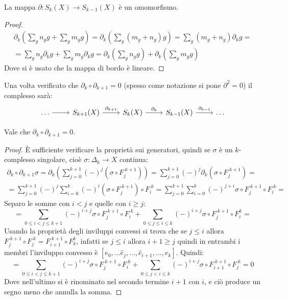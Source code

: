 \begin{proposition}
  La mappa $ \partial \colon S_k(X) \to S_{k-1}(X) $ è un omomorfismo.
\end{proposition}
\begin{proof}
  \begin{gather*}
    \partial_k \left( \sum_g n_g g + \sum_g m_g g\right) = \partial_k \left( \sum_g(m_g + n_g)g \right) = \sum_g (m_g + n_g) \partial_k g = \\
    = \sum_g n_g \partial_k g + \sum_g m_g \partial_k g = \partial_k \left( \sum_g n_g g\right) + \partial_k \left( \sum_g m_g g \right)
  \end{gather*}
  Dove si è usato che la mappa di bordo è lineare.
\end{proof}
\hfill \newline \newline \noindent
Una volta verificato che $ \partial_k \circ \partial_{k+1} = 0 $ (spesso come notazione si pone $ \partial^2 = 0 $)
il complesso sarà:
\[
  \begin{tikzcd}
    \dots \rar & S_{k+1}(X) \arrow{r}{\partial_{k+1}} & S_k(X) \arrow{r}{\partial_k} & S_{k-1}(X) \arrow{r}{\partial_{k-1}} & \dots
  \end{tikzcd}
\]
\vspace*{-12pt}
\begin{proposition}
  Vale che $ \partial_k \circ \partial_{k+1} = 0 $.
\end{proposition}
\begin{proof}
  È sufficiente verificare la proprietà sui generatori, quindi se $ \sigma $ è un
  $ k $-complesso singolare, cioè $ \sigma : \Delta_k \to X $ continua:
  \begin{gather*}
    \partial_k \circ \partial_{k+1} \sigma = \partial_k \left( \sum_{j=0}^{k+1}(-)^j (\sigma \circ F_j^{\; k+1}) \right) =  \sum_{j=0}^{k+1}(-)^j \partial_k (\sigma \circ F_j^{\; k+1}) = \\
    = \sum_{j=0}^{k+1} (-)^j \sum_{i=0}^k (-)^i (\sigma \circ F_j^{\; k+1}) \circ F_i^{\; k} = \sum_{j = 0}^{k+1} \sum_{i = 0}^{k} (-)^{j+i} \sigma \circ F_j^{\; k+1} \circ F_{i}^{\; k} =
  \end{gather*}
  Separo le somme con $ i < j $ e quelle con $ i \geq j $:
  \[
    = \sum_{0 \leq i < j \leq k + 1} (-)^{i+j} \sigma \circ F_j^{\; k+1} \circ F_i^{\; k} + \sum_{0 \leq j \leq i \leq k} (-)^{i+j} \sigma \circ F_j^{\; k+1} \circ F_i^k =
  \]
  Usando la proprietà degli inviluppi convessi si trova che se $ j \leq i $ allora
  $ F_j^{\; k+1} \circ F_j^{\; k} = F_{i+1}^{\; k+1} \circ F_k^{k} $, infatti se
  $ j \leq i $ allora $ i + 1 \geq j $ quindi in entrambi i membri l'inviluppo convesso è
  $ [e_0, \dots \hat{e}_j, \dots, \hat{e}_{i+1}, \dots, e_k] $. Quindi:
  \[
    = \sum_{0 \leq i < j \leq k + 1} (-)^{i+j} \sigma \circ F_j^{\; k+1} \circ F_i^{\; k} + \sum_{0 \leq j < i \leq k} (-)^{i+j} \sigma \circ F_{i+1}^{\; k+1} \circ F_j^{\; k}  =  0
  \]
  Dove nell'ultimo si è rinominato nel secondo termine $ i + 1 $ con $ i $, e ciò produce un segno
  meno che annulla la somma.
\end{proof}

